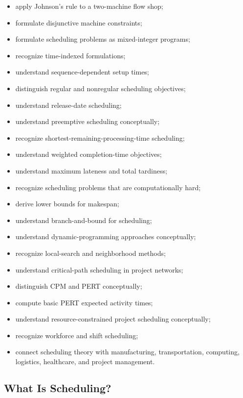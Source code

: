 {\begin{itemize}
    \item apply Johnson's rule to a two-machine flow shop;
    \item formulate disjunctive machine constraints;
    \item formulate scheduling problems as mixed-integer programs;
    \item recognize time-indexed formulations;
    \item understand sequence-dependent setup times;
    \item distinguish regular and nonregular scheduling objectives;
    \item understand release-date scheduling;
    \item understand preemptive scheduling conceptually;
    \item recognize shortest-remaining-processing-time scheduling;
    \item understand weighted completion-time objectives;
    \item understand maximum lateness and total tardiness;
    \item recognize scheduling problems that are computationally hard;
    \item derive lower bounds for makespan;
    \item understand branch-and-bound for scheduling;
    \item understand dynamic-programming approaches conceptually;
    \item recognize local-search and neighborhood methods;
    \item understand critical-path scheduling in project networks;
    \item distinguish CPM and PERT conceptually;
    \item compute basic PERT expected activity times;
    \item understand resource-constrained project scheduling conceptually;
    \item recognize workforce and shift scheduling;
    \item connect scheduling theory with manufacturing, transportation,
          computing, logistics, healthcare, and project management.
\end{itemize}
}

\subsection{What Is Scheduling?}
\label{subsec:what-is-scheduling}

